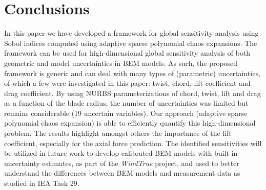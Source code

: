 \section{Conclusions}\label{sec:conclusions}
In this paper we have developed a framework for global sensitivity analysis using Sobol indices computed using adaptive sparse polynomial chaos expansions. The framework can be used for high-dimensional global sensitivity analysis of both geometric and model uncertainties in BEM models. As such, the proposed framework is generic and can deal with many types of (parametric) uncertainties, of which a few were investigated in this paper: twist, chord, lift coefficient and drag coefficient. By using NURBS parameterizations of chord, twist, lift and drag as a function of the blade radius, the number of uncertainties was limited but remains considerable (19 uncertain variables). Our approach (adaptive sparse polynomial chaos expansion) is able to efficiently quantify this high-dimensional problem. The results highlight amongst others the importance of the lift coefficient, especially for the axial force prediction. The identified sensitivities will be utilized in future work to develop calibrated BEM models with built-in uncertainty estimates, as part of the \textit{WindTrue} project, and used to better understand the differences between BEM models and measurement data as studied in IEA Task 29. 
